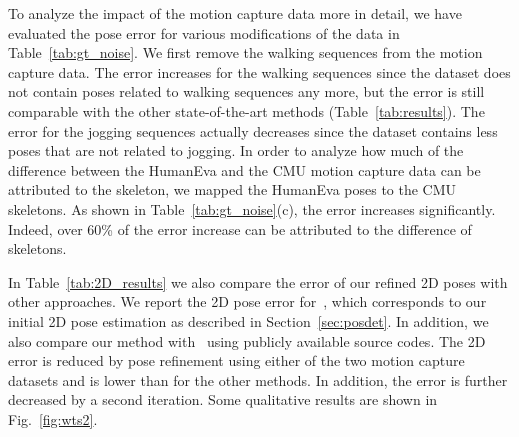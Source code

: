 \documentclass[10pt,twocolumn,letterpaper]{article}
\begin{document}
To analyze the impact of the motion capture data more in detail, we have evaluated the pose error for various modifications of the data in Table~\ref{tab:gt_noise}. We first remove the walking sequences from the motion capture data. The error increases for the walking sequences since the dataset does not contain poses related to walking sequences any more, but the error is still comparable with the other state-of-the-art methods (Table~\ref{tab:results}). The error for the jogging sequences actually decreases since the dataset contains less poses that are not related to jogging. In order to analyze how much of the difference between the HumanEva and the CMU motion capture data can be attributed to the skeleton, we mapped the HumanEva poses to the CMU skeletons. As shown in Table~\ref{tab:gt_noise}(c), the error increases significantly. Indeed, over 60\% of the error increase can be attributed to the difference of skeletons.
\begin{table}[t]
\centering
{}
\caption{Impact of the MoCap data. \textbf{(a)} MoCap from HumanEva dataset. \textbf{(b)} MoCap from HumanEva dataset without walking sequences. \textbf{(c)} MoCap from HumanEva dataset but skeleton is retargeted to CMU skeleton. \textbf{(d)} MoCap from CMU dataset. The average 3D pose error (mm) is reported for the HumanEva-I dataset with one iteration.}
\label{tab:gt_noise}
\end{table}
In Table~\ref{tab:2D_results} we also compare the error of our refined 2D poses with other approaches. We report the 2D pose error for~\cite{dantone_tpami2014}, which corresponds to our initial 2D pose estimation as described in Section~\ref{sec:posdet}. In addition, we also compare our method with~\cite{YiYang-2011, Wang_CVPR2013, desai_eccv2012} using publicly available source codes. The 2D error is reduced by pose refinement using either of the two motion capture datasets and is lower than for the other methods. In addition, the error is further decreased by a second iteration. Some qualitative results are shown in Fig.~\ref{fig:wts2}.
\end{document}
